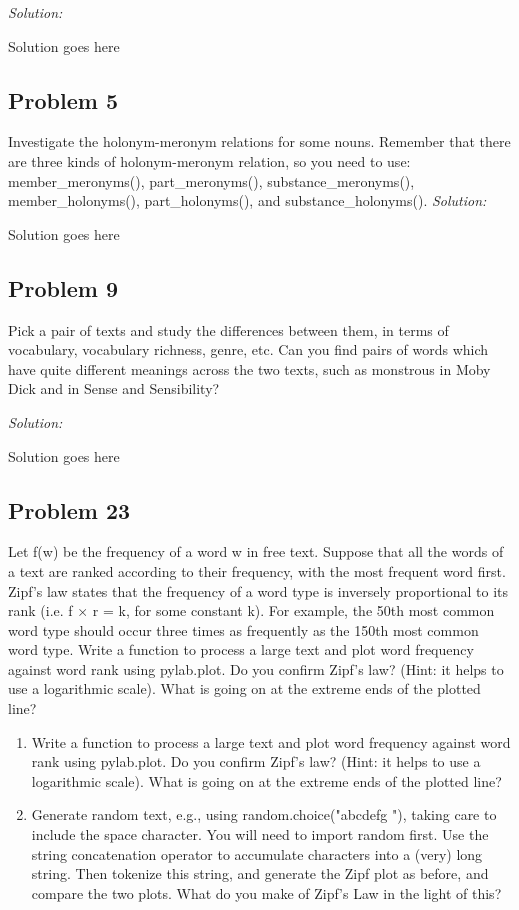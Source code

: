 \documentclass[11pt]{article}
\newenvironment{solution}{
	\vspace{10px}\noindent\emph{Solution:}
}{
	\vspace{10px}
}
\begin{document}
\begin{solution}
	Solution goes here
\end{solution}  


\subsection*{Problem 5}
Investigate the holonym-meronym relations for some nouns. Remember that there are three kinds of holonym-meronym relation, so you need to use: member\_meronyms(), part\_meronyms(),  substance\_meronyms(), member\_holonyms(), part\_holonyms(), and substance\_holonyms().
\begin{solution}
	Solution goes here
\end{solution}  


\subsection*{Problem 9}
Pick a pair of texts and study the differences between them, in terms of vocabulary, vocabulary richness, genre, etc. Can you find pairs of words which have quite different meanings across the two texts, such as monstrous in Moby Dick and in Sense and Sensibility?

\begin{solution}
	Solution goes here
\end{solution}  


\subsection*{Problem 23}
Let f(w) be the frequency of a word w in free text. Suppose that all the words of a text are ranked according to their frequency, with the most frequent word first. Zipf's law states that the frequency of a word type is inversely proportional to its rank (i.e. f × r = k, for some constant k). For example, the 50th most common word type should occur three times as frequently as the 150th most common word type.
Write a function to process a large text and plot word frequency against word rank using pylab.plot. Do you confirm Zipf's law? (Hint: it helps to use a logarithmic scale). What is going on at the extreme ends of the plotted line?
\begin{enumerate}
	\item Write a function to process a large text and plot word frequency against word rank using pylab.plot. Do you confirm Zipf's law? (Hint: it helps to use a logarithmic scale). What is going on at the extreme ends of the plotted line?
	\item Generate random text, e.g., using random.choice("abcdefg "), taking care to include the space character. You will need to import random first. Use the string concatenation operator to accumulate characters into a (very) long string. Then tokenize this string, and generate the Zipf plot as before, and compare the two plots. What do you make of Zipf's Law in the light of this?
\end{enumerate}
\end{document}

